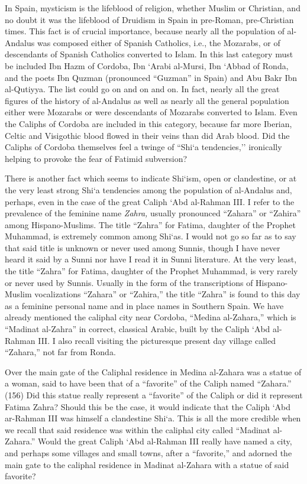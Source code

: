 In Spain, mysticism is the lifeblood of religion, whether Muslim or Christian, and no doubt it was the lifeblood of Druidism in Spain in pre-Roman, pre-Christian times. This fact is of crucial importance, because nearly all the population of al-Andalus was composed either of Spanish Catholics, i.e., the Mozarabs, or of descendants of Spanish Catholics converted to Islam. In this last category must be included Ibn Hazm of Cordoba, Ibn `Arabi al-Mursi, Ibn `Abbad of Ronda, and the poets Ibn Quzman (pronounced ``Guzman'' in Spain) and Abu Bakr Ibn al-Qutiyya. The list could go on and on and on. In fact, nearly all the great figures of the history of al-Andalus as well as nearly all the general population either were Mozarabs or were descendants of Mozarabs converted to Islam. Even the Caliphs of Cordoba are included in this category, because far more Iberian, Celtic and Visigothic blood flowed in their veins than did Arab blood. Did the Caliphs of Cordoba themselves feel a twinge of ``Shi`a tendencies,'' ironically helping to provoke the fear of Fatimid subversion?

There is another fact which seems to indicate Shi`ism, open or clandestine, or at the very least strong Shi`a tendencies among the population of al-Andalus and, perhaps, even in the case of the great Caliph `Abd al-Rahman III. I refer to the prevalence of the feminine name \emph{Zahra,} usually pronounced ``Zahara'' or ``Zahira'' among Hispano-Muslims. The title ``Zahra'' for Fatima, daughter of the Prophet Muhammad, is extremely common among Shi`as. I would not go so far as to say that said title is unknown or never used among Sunnis, though I have never heard it said by a Sunni nor have I read it in Sunni literature. At the very least, the title ``Zahra'' for Fatima, daughter of the Prophet Muhammad, is very rarely or never used by Sunnis. Usually in the form of the transcriptions of Hispano-Muslim vocalizations ``Zahara'' or ``Zahira,'' the title ``Zahra'' is found to this day as a feminine personal name and in place names in Southern Spain. We have already mentioned the caliphal city near Cordoba, ``Medina al-Zahara,'' which is ``Madinat al-Zahra'' in correct, classical Arabic, built by the Caliph `Abd al-Rahman III. I also recall visiting the picturesque present day village called ``Zahara,'' not far from Ronda.

Over the main gate of the Caliphal residence in Medina al-Zahara was a statue of a woman, said to have been that of a ``favorite'' of the Caliph named ``Zahara.'' (156) Did this statue really represent a ``favorite'' of the Caliph or did it represent Fatima Zahra? Should this be the case, it would indicate that the Caliph `Abd ar-Rahman III was himself a clandestine Shi`a. This is all the more credible when we recall that said residence was within the caliphal city called ``Madinat al-Zahara.'' Would the great Caliph `Abd al-Rahman III really have named a city, and perhaps some villages and small towns, after a ``favorite,'' and adorned the main gate to the caliphal residence in Madinat al-Zahara with a statue of said favorite?

